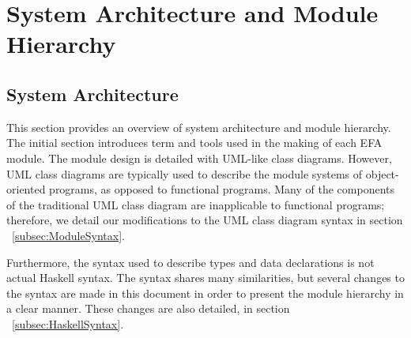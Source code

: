 \noindent
\chapter{System Architecture and Module Hierarchy}


\section{System Architecture}\label{SystemArch}

This section provides an overview of system architecture and module hierarchy. 
The 
initial section introduces term and tools used in the making of each EFA 
module. The module design is detailed with UML-like class diagrams. However, 
UML class diagrams are typically
used to describe the module systems of object-oriented programs, as opposed to
functional programs. Many of the components of the traditional UML class
diagram are inapplicable to functional programs; therefore, we detail our
modifications to the UML class diagram syntax in 
section ~\ref{subsec:ModuleSyntax}.

Furthermore, the syntax used to describe types and data declarations is not
actual Haskell syntax. The syntax shares many similarities, but several changes
to the syntax are made in this document in order to present the module hierarchy
in a clear manner. These changes are also detailed, in 
section ~\ref{subsec:HaskellSyntax}.


